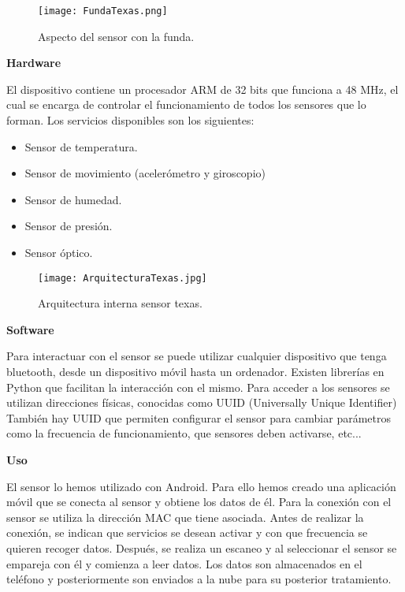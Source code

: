 \documentclass[11pt,spanish]{article}
\begin{document}
\begin{figure}[h!]
  \centering
  \texttt{[image: FundaTexas.png]}
  \caption{Aspecto del sensor con la funda.}
\end{figure}

{\bf Hardware}
\newline

El dispositivo contiene un procesador ARM de 32 bits que funciona a 48 MHz, el cual se encarga de controlar el funcionamiento de todos los sensores que lo forman. Los servicios disponibles son los siguientes:

\begin{itemize}
  \item Sensor de temperatura.
  \item Sensor de movimiento (acelerómetro y giroscopio)
  \item Sensor de humedad.
  \item Sensor de presión.
  \item Sensor óptico.
\end{itemize}

\begin{figure}[h!]
  \centering
  \texttt{[image: ArquitecturaTexas.jpg]}
  \caption{Arquitectura interna sensor texas.}
\end{figure}

{\bf Software}
\newline

Para interactuar con el sensor se puede utilizar cualquier dispositivo que tenga bluetooth, desde un dispositivo móvil hasta un ordenador. Existen librerías en Python que facilitan la interacción con el mismo. Para acceder a los sensores se utilizan direcciones físicas, conocidas como UUID (Universally Unique Identifier) También hay UUID que permiten configurar el sensor para cambiar parámetros como la frecuencia de funcionamiento, que sensores deben activarse, etc...
\newline

{\bf Uso}
\newline

El sensor lo hemos utilizado con Android. Para ello hemos creado una aplicación móvil que se conecta al sensor y obtiene los datos de él. Para la conexión con el sensor se utiliza la dirección MAC que tiene asociada. Antes de realizar la conexión, se indican que servicios se desean activar y con que frecuencia se quieren recoger datos. Después, se realiza un escaneo y al seleccionar el sensor se empareja con él y comienza a leer datos. Los datos son almacenados en el teléfono y posteriormente son enviados a la nube para su posterior tratamiento.
\end{document}
